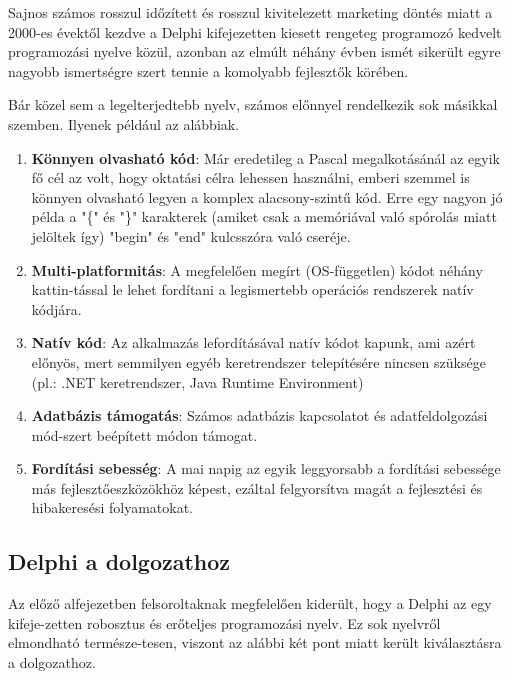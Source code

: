 Sajnos számos rosszul időzített és rosszul kivitelezett marketing döntés miatt a 2000-es évektől kezdve a Delphi kifejezetten kiesett rengeteg programozó kedvelt programozási nyelve közül, azonban az elmúlt néhány évben ismét sikerült egyre nagyobb ismertségre szert tennie a komolyabb fejlesztők körében.

Bár közel sem a legelterjedtebb nyelv, számos előnnyel rendelkezik sok másikkal szemben. Ilyenek például az alábbiak.
\begin{enumerate}
	\item \textbf{Könnyen olvasható kód}: Már eredetileg a Pascal megalkotásánál az egyik fő cél az volt, hogy oktatási célra lehessen használni, emberi szemmel is könnyen olvasható legyen a komplex alacsony-szintű kód. Erre egy nagyon jó példa a "\{" és "\}" karakterek (amiket csak a memóriával való spórolás miatt jelöltek így) "begin" és "end" kulcsszóra való cseréje.
	\item \textbf{Multi-platformitás}: A megfelelően megírt (OS-független) kódot néhány kattin\hyp{}tással le lehet fordítani a legismertebb operációs rendszerek natív kódjára.
	\item \textbf{Natív kód}: Az alkalmazás lefordításával natív kódot kapunk, ami azért előnyös, mert semmilyen egyéb keretrendszer telepítésére nincsen szüksége (pl.: .NET keretrendszer, Java Runtime Environment)
	\item \textbf{Adatbázis támogatás}: Számos adatbázis kapcsolatot és adatfeldolgozási mód\hyp{}szert beépített módon támogat.
	\item \textbf{Fordítási sebesség}: A mai napig az egyik leggyorsabb a fordítási sebessége más fejlesztőeszközökhöz képest, ezáltal felgyorsítva magát a fejlesztési és hibakeresési folyamatokat.
\end{enumerate}

\subsection{Delphi a dolgozathoz}

Az előző alfejezetben felsoroltaknak megfelelően kiderült, hogy a Delphi az egy kifeje\hyp{}zetten robosztus és erőteljes programozási nyelv. Ez sok nyelvről elmondható természe\hyp{}tesen, viszont az alábbi két pont miatt került kiválasztásra a dolgozathoz.

